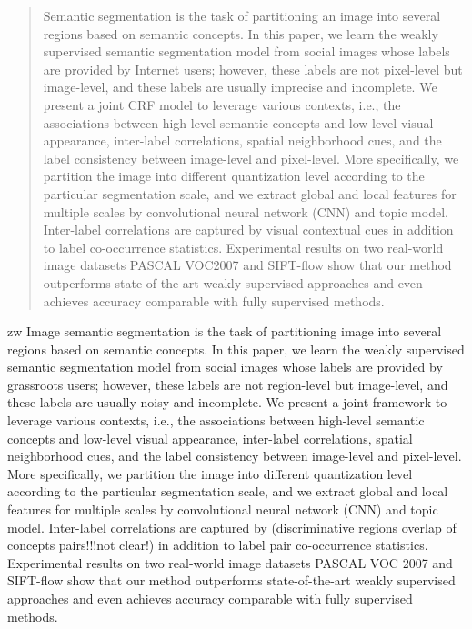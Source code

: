 \begin{abstract}
Semantic segmentation is the task of partitioning an image into several regions based on semantic concepts. 
In this paper, we learn the weakly supervised semantic segmentation model from social images whose labels are provided by Internet users; however, these labels are not pixel-level but image-level, and these labels are usually imprecise and incomplete.
We present a joint CRF model to leverage various contexts, i.e., the associations between high-level semantic concepts and low-level visual appearance, inter-label correlations, spatial neighborhood cues, and the label consistency between image-level and pixel-level. 
More specifically, we partition the image into different quantization level according to the particular segmentation scale, and we extract global and local features for multiple scales by convolutional neural network (CNN) and topic model. 
Inter-label correlations are captured by visual contextual cues in addition to label co-occurrence statistics.
Experimental results on two real-world image datasets PASCAL VOC2007 and SIFT-flow show that our method outperforms state-of-the-art weakly supervised approaches and even achieves accuracy comparable with fully supervised methods.
\end{abstract}

\if zw
	Image semantic segmentation is the task of partitioning image into several regions based on semantic concepts.   In this paper, we learn the weakly supervised  semantic segmentation model from social images whose labels are  provided by grassroots users; however, these labels are not region-level but image-level, and these labels are usually noisy and incomplete.  We present a joint framework to leverage various contexts, i.e., the associations between high-level semantic concepts and low-level visual appearance, inter-label correlations, spatial neighborhood cues, and the label consistency between image-level and pixel-level. More specifically, we partition the image into different quantization level according to the particular segmentation scale, and we extract global and local features for multiple scales by convolutional neural network (CNN) and topic model. Inter-label correlations  are captured by (discriminative regions overlap of concepts pairs!!!not clear!) in addition to label pair co-occurrence statistics.   Experimental results on two real-world image datasets PASCAL VOC 2007 and SIFT-flow show that our method outperforms  state-of-the-art weakly supervised approaches and even achieves accuracy comparable with fully supervised methods.
\figit

